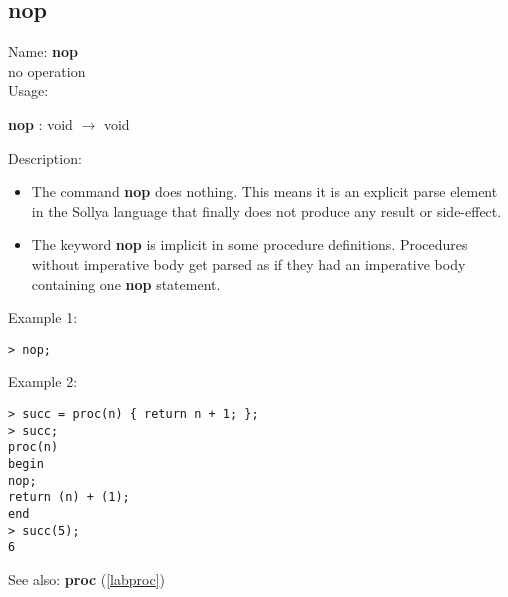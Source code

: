 \subsection{nop}
\label{labnop}
\noindent Name: \textbf{nop}\\
no operation\\

\noindent Usage: 
\begin{center}
\textbf{nop} : \textsf{void} $\rightarrow$ \textsf{void}\\
\end{center}
\noindent Description: \begin{itemize}

\item The command \textbf{nop} does nothing. This means it is an explicit parse
   element in the Sollya language that finally does not produce any
   result or side-effect.

\item The keyword \textbf{nop} is implicit in some procedure
   definitions. Procedures without imperative body get parsed as if they
   had an imperative body containing one \textbf{nop} statement.
\end{itemize}
\noindent Example 1: 
\begin{center}\begin{minipage}{15cm}\begin{Verbatim}[frame=single]
> nop;
\end{Verbatim}
\end{minipage}\end{center}
\noindent Example 2: 
\begin{center}\begin{minipage}{15cm}\begin{Verbatim}[frame=single]
> succ = proc(n) { return n + 1; };
> succ;
proc(n)
begin
nop;
return (n) + (1);
end
> succ(5);
6
\end{Verbatim}
\end{minipage}\end{center}
See also: \textbf{proc} (\ref{labproc})
